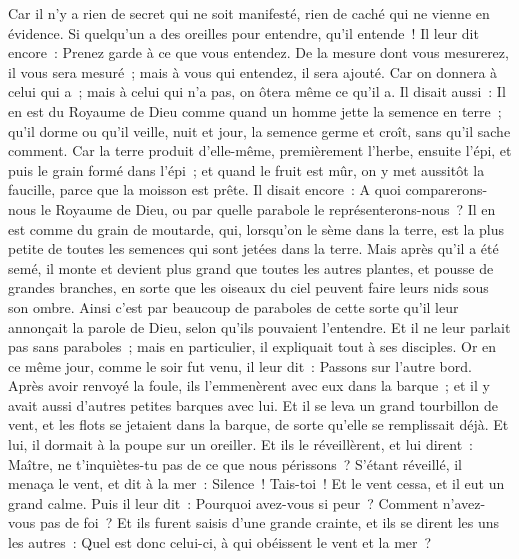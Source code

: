 \begin{multicols}{2}
Car il n'y a rien de secret qui ne soit manifesté, rien de caché qui ne vienne en évidence.
Si quelqu'un a des oreilles pour entendre, qu'il entende~!
Il leur dit encore~: Prenez garde à ce que vous entendez. De la mesure dont vous mesurerez, il vous sera mesuré~; mais à vous qui entendez, il sera ajouté.
Car on donnera à celui qui a~; mais à celui qui n'a pas, on ôtera même ce qu'il a.
Il disait aussi~: Il en est du Royaume de Dieu comme quand un homme jette la semence en terre~;
qu'il dorme ou qu'il veille, nuit et jour, la semence germe et croît, sans qu'il sache comment.
Car la terre produit d'elle-même, premièrement l'herbe, ensuite l'épi, et puis le grain formé dans l'épi~;
et quand le fruit est mûr, on y met aussitôt la faucille, parce que la moisson est prête.
Il disait encore~: A quoi comparerons-nous le Royaume de Dieu, ou par quelle parabole le représenterons-nous~?
Il en est comme du grain de moutarde, qui, lorsqu'on le sème dans la terre, est la plus petite de toutes les semences qui sont jetées dans la terre.
Mais après qu'il a été semé, il monte et devient plus grand que toutes les autres plantes, et pousse de grandes branches, en sorte que les oiseaux du ciel peuvent faire leurs nids sous son ombre.
Ainsi c'est par beaucoup de paraboles de cette sorte qu'il leur annonçait la parole de Dieu, selon qu'ils pouvaient l'entendre.
Et il ne leur parlait pas sans paraboles~; mais en particulier, il expliquait tout à ses disciples.
Or en ce même jour, comme le soir fut venu, il leur dit~: Passons sur l'autre bord.
Après avoir renvoyé la foule, ils l'emmenèrent avec eux dans la barque~; et il y avait aussi d'autres petites barques avec lui.
Et il se leva un grand tourbillon de vent, et les flots se jetaient dans la barque, de sorte qu'elle se remplissait déjà.
Et lui, il dormait à la poupe sur un oreiller. Et ils le réveillèrent, et lui dirent~: Maître, ne t'inquiètes-tu pas de ce que nous périssons~?
S'étant réveillé, il menaça le vent, et dit à la mer~: Silence~! Tais-toi~! Et le vent cessa, et il eut un grand calme.
Puis il leur dit~: Pourquoi avez-vous si peur~? Comment n'avez-vous pas de foi~?
Et ils furent saisis d'une grande crainte, et ils se dirent les uns les autres~: Quel est donc celui-ci, à qui obéissent le vent et la mer~?

\end{multicols}
